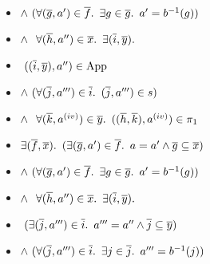 \begin{itemize}
  \addtolength{\itemsep}{-.5\baselineskip}
  \item[\phantom{\imps}]
    \quad $\land~(\forall (\overline{g},a^\prime)\in\overline{f}\ldotp~\exists g\in\overline{g}\ldotp~a^\prime = b^{-1}(g))$

  \item[\phantom{\imps}]
    \quad $\land~\phantom{(}\forall(\overline{h},a^{\prime\prime})\in\overline{x}\ldotp~\exists(\overline{i},\overline{y})\ldotp$

  \item[\phantom{\imps}]
    \quad\quad\quad\phantom{$\land$}$~((\overline{i},\overline{y}),a^{\prime\prime})\in\operatorname{App}$

  \item[\phantom{\imps}]
    \quad\quad\quad$\land~(\forall (\overline{j},a^{\prime\prime\prime})\in\overline{i}\ldotp~(\overline{j},a^{\prime\prime\prime})\in s)$
    \marginnote{\Def-$\lambda\cdot$}

  \item[\phantom{\imps}]
    \quad\quad\quad$\land~\phantom{(}\forall (\overline{k},a^{\text (iv)})\in\overline{y}\ldotp~((\overline{h}, \overline{k}),a^{\text (iv)})\in\pi_1$
    \marginnote{\Def-$\lambda\cdot$}
  \addtolength{\itemsep}{.5\baselineskip}

  \item[\iffs]
    $\exists (\overline{f},\overline{x})\ldotp~(\exists(\overline{g},a^\prime)\in\overline{f}\ldotp~a=a^\prime\land\overline{g}\subseteq\overline{x})$
    \marginnote{\Def-$\App$}

  \addtolength{\itemsep}{-.5\baselineskip}
  \item[\phantom{\imps}]
    \quad $\land~(\forall (\overline{g},a^\prime)\in\overline{f}\ldotp~\exists g\in\overline{g}\ldotp~a^\prime = b^{-1}(g))$

  \item[\phantom{\imps}]
    \quad $\land~\phantom{(}\forall(\overline{h},a^{\prime\prime})\in\overline{x}\ldotp~\exists(\overline{i},\overline{y})\ldotp$

  \item[\phantom{\imps}]
    \quad\quad\quad\phantom{$\land$}$~(\exists (\overline{j},a^{\prime\prime\prime})\in\overline{i}\ldotp~a^{\prime\prime\prime} = a^{\prime\prime}\land\overline{j}\subseteq\overline{y})$
    \marginnote{\Def-$\App$}

  \item[\phantom{\imps}]
    \quad\quad\quad$\land~(\forall (\overline{j},a^{\prime\prime\prime})\in\overline{i}\ldotp~\exists j\in\overline{j}\ldotp~a^{\prime\prime\prime}=b^{-1}(j))$


\end{itemize}

